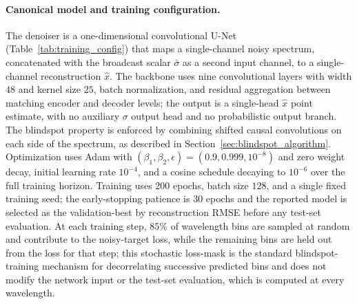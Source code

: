 \documentclass[twocolumn]{aastex7}
\newcounter{algorithm}
\begin{document}
\paragraph{Canonical model and training configuration.}
The denoiser is a one-dimensional convolutional U-Net (Table~\ref{tab:training_config}) that maps a single-channel noisy spectrum, concatenated with the broadcast scalar $\bar{\sigma}$ as a second input channel, to a single-channel reconstruction $\hat{x}$. The backbone uses nine convolutional layers with width $48$ and kernel size $25$, batch normalization, and residual aggregation between matching encoder and decoder levels; the output is a single-head $\hat{x}$ point estimate, with no auxiliary $\sigma$ output head and no probabilistic output branch. The blindspot property is enforced by combining shifted causal convolutions on each side of the spectrum, as described in Section~\ref{sec:blindspot_algorithm}. Optimization uses Adam with $(\beta_1,\beta_2,\epsilon)=(0.9,0.999,10^{-8})$ and zero weight decay, initial learning rate $10^{-4}$, and a cosine schedule decaying to $10^{-6}$ over the full training horizon. Training uses $200$ epochs, batch size $128$, and a single fixed training seed; the early-stopping patience is $30$ epochs and the reported model is selected as the validation-best by reconstruction RMSE before any test-set evaluation. At each training step, $85\%$ of wavelength bins are sampled at random and contribute to the noisy-target loss, while the remaining bins are held out from the loss for that step; this stochastic loss-mask is the standard blindspot-training mechanism for decorrelating successive predicted bins and does not modify the network input or the test-set evaluation, which is computed at every wavelength.
\end{document}
